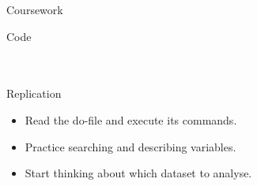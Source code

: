 \documentclass[t]{beamer}
\begin{document}
  \begin{frame}[t]{Coursework}

    \begin{block}{Code}
	    \\
	    \\
      
			\\
    \end{block}

    \begin{alertblock}{Replication}
      \begin{itemize}
	       \item Read the do-file and execute its commands.
	       \item Practice searching and describing variables.
	       \item Start thinking about which dataset to analyse.
      \end{itemize}
    \end{alertblock}

  \end{frame}
	
\end{document}
